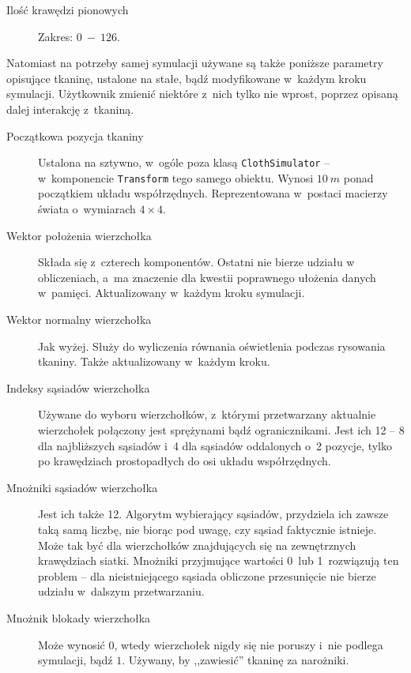 \begin{description}
			\item[Ilość krawędzi pionowych] Zakres: \(0\ -\ 126\).
			
		\end{description}
		
		Natomiast na potrzeby samej symulacji używane są także poniższe parametry opisujące tkaninę, ustalone na stałe, bądź modyfikowane w~każdym kroku symulacji. Użytkownik zmienić niektóre z~nich tylko nie wprost, poprzez opisaną dalej interakcję z~tkaniną.
		
		\begin{description}
			
			\item[Początkowa pozycja tkaniny] Ustalona na sztywno, w~ogóle poza klasą \texttt{ClothSimulator} -- w~komponencie \texttt{Transform} tego samego obiektu. Wynosi \(10\ m\) ponad początkiem układu współrzędnych. Reprezentowana w~postaci macierzy świata o~wymiarach \(4\times4 \).
			
			\item[Wektor położenia wierzchołka] Składa się z~czterech komponentów. Ostatni nie bierze udziału w obliczeniach, a~ma znaczenie dla kwestii poprawnego ułożenia danych w~pamięci. Aktualizowany w~każdym kroku symulacji.
			
			\item[Wektor normalny wierzchołka] Jak wyżej. Służy do wyliczenia równania oświetlenia podczas rysowania tkaniny. Także aktualizowany w~każdym kroku.
			
			\item[Indeksy sąsiadów wierzchołka] Używane do wyboru wierzchołków, z~którymi przetwarzany aktualnie wierzchołek połączony jest sprężynami bądź ogranicznikami. Jest ich 12 -- 8 dla najbliższych sąsiadów i~4 dla sąsiadów oddalonych o~2 pozycje, tylko po krawędziach prostopadłych do osi układu współrzędnych. 
			
			\item[Mnożniki sąsiadów wierzchołka] Jest ich także 12. Algorytm wybierający sąsiadów, przydziela ich zawsze taką samą liczbę, nie biorąc pod uwagę, czy sąsiad faktycznie istnieje. Może tak być dla wierzchołków znajdujących się na zewnętrznych krawędziach siatki. Mnożniki przyjmujące wartości 0~lub 1~rozwiązują ten problem -- dla nieistniejącego sąsiada obliczone przesunięcie nie bierze udziału w~dalszym przetwarzaniu.
			
			\item[Mnożnik blokady wierzchołka] Może wynosić \(0\), wtedy wierzchołek nigdy się nie poruszy i~nie podlega symulacji, bądź \(1\). Używany, by ,,zawiesić'' tkaninę za narożniki.
			

\end{description}
